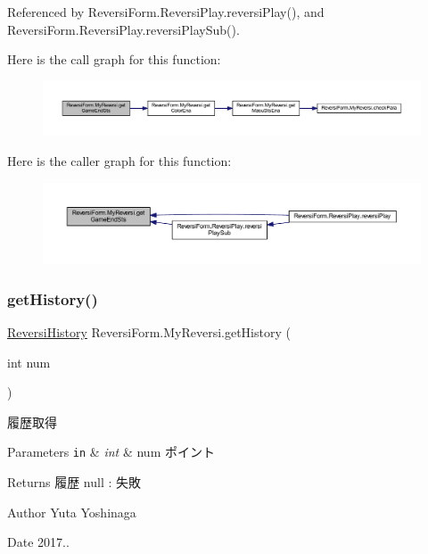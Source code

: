 Referenced by Reversi\+Form.\+Reversi\+Play.\+reversi\+Play(), and Reversi\+Form.\+Reversi\+Play.\+reversi\+Play\+Sub().

Here is the call graph for this function\+:
\nopagebreak
\begin{figure}[H]
\begin{center}
\leavevmode
\includegraphics[width=350pt]{class_reversi_form_1_1_my_reversi_aa39c8c111afeb4ea3bf2befbd9f1434b_cgraph}
\end{center}
\end{figure}
Here is the caller graph for this function\+:
\nopagebreak
\begin{figure}[H]
\begin{center}
\leavevmode
\includegraphics[width=350pt]{class_reversi_form_1_1_my_reversi_aa39c8c111afeb4ea3bf2befbd9f1434b_icgraph}
\end{center}
\end{figure}
\mbox{\label{class_reversi_form_1_1_my_reversi_a249dba624bda1144c23cc53f68c35c67}} 
\subsubsection{\texorpdfstring{get\+History()}{getHistory()}}
{\footnotesize\ttfamily \hyperlink{class_reversi_form_1_1_reversi_history}{Reversi\+History} Reversi\+Form.\+My\+Reversi.\+get\+History (\begin{DoxyParamCaption}\item[{int}]{num }\end{DoxyParamCaption})}



履歴取得 


\begin{DoxyParams}[1]{Parameters}
\mbox{\tt in}  & {\em int} & num ポイント \\
\hline
\end{DoxyParams}
\begin{DoxyReturn}{Returns}
履歴 null \+: 失敗 
\end{DoxyReturn}
\begin{DoxyAuthor}{Author}
Yuta Yoshinaga 
\end{DoxyAuthor}
\begin{DoxyDate}{Date}
2017.. 
\end{DoxyDate}


